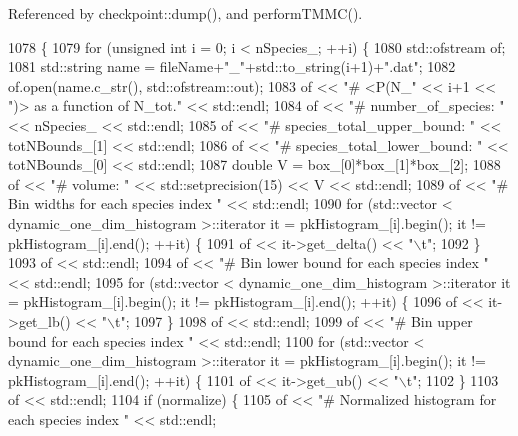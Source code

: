 Referenced by checkpoint\-::dump(), and perform\-T\-M\-M\-C().


\begin{DoxyCode}
1078                                                                                 \{
1079     \textcolor{keywordflow}{for} (\textcolor{keywordtype}{unsigned} \textcolor{keywordtype}{int} i = 0; i < nSpecies\_; ++i) \{
1080         std::ofstream of;
1081         std::string name = fileName+\textcolor{stringliteral}{"\_"}+std::to\_string(i+1)+\textcolor{stringliteral}{".dat"};
1082         of.open(name.c\_str(), std::ofstream::out);
1083         of << \textcolor{stringliteral}{"# <P(N\_"} << i+1 << \textcolor{stringliteral}{")> as a function of N\_tot."} << std::endl;
1084         of << \textcolor{stringliteral}{"# number\_of\_species: "} << nSpecies\_ << std::endl;
1085         of << \textcolor{stringliteral}{"# species\_total\_upper\_bound: "} << totNBounds\_[1] << std::endl;
1086         of << \textcolor{stringliteral}{"# species\_total\_lower\_bound: "} << totNBounds\_[0] << std::endl;
1087         \textcolor{keywordtype}{double} V = box\_[0]*box\_[1]*box\_[2];
1088         of << \textcolor{stringliteral}{"# volume: "} << std::setprecision(15) << V << std::endl;
1089         of << \textcolor{stringliteral}{"# Bin widths for each species index "} << std::endl;
1090         \textcolor{keywordflow}{for} (std::vector < dynamic\_one\_dim\_histogram >::iterator it = pkHistogram\_[i].begin(); it != 
      pkHistogram\_[i].end(); ++it) \{
1091             of << it->get\_delta() << \textcolor{stringliteral}{"\(\backslash\)t"};
1092         \}
1093         of << std::endl;
1094         of << \textcolor{stringliteral}{"# Bin lower bound for each species index "} << std::endl;
1095         \textcolor{keywordflow}{for} (std::vector < dynamic\_one\_dim\_histogram >::iterator it = pkHistogram\_[i].begin(); it != 
      pkHistogram\_[i].end(); ++it) \{
1096             of << it->get\_lb() << \textcolor{stringliteral}{"\(\backslash\)t"};
1097         \}
1098         of << std::endl;
1099         of << \textcolor{stringliteral}{"# Bin upper bound for each species index "} << std::endl;
1100         \textcolor{keywordflow}{for} (std::vector < dynamic\_one\_dim\_histogram >::iterator it = pkHistogram\_[i].begin(); it != 
      pkHistogram\_[i].end(); ++it) \{
1101             of << it->get\_ub() << \textcolor{stringliteral}{"\(\backslash\)t"};
1102         \}
1103         of << std::endl;
1104         \textcolor{keywordflow}{if} (normalize) \{
1105             of << \textcolor{stringliteral}{"# Normalized histogram for each species index "} << std::endl;

\end{DoxyCode}
